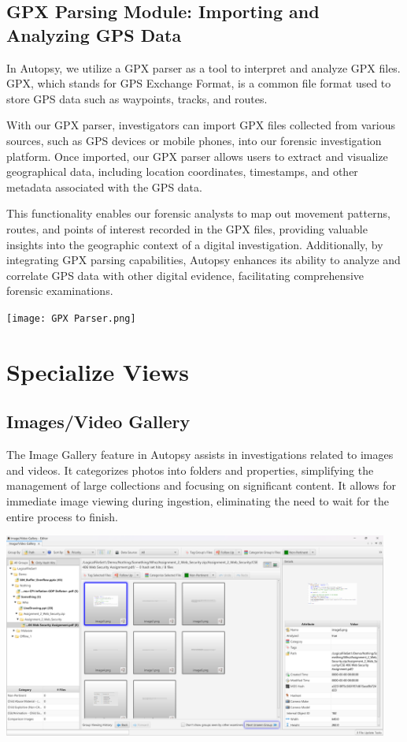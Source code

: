 \documentclass{article}
\begin{document}
\subsection{GPX Parsing Module: Importing and Analyzing GPS Data}

In Autopsy, we utilize a GPX parser as a tool to interpret and analyze GPX files. GPX, which stands for GPS Exchange Format, is a common file format used to store GPS data such as waypoints, tracks, and routes.

With our GPX parser, investigators can import GPX files collected from various sources, such as GPS devices or mobile phones, into our forensic investigation platform. Once imported, our GPX parser allows users to extract and visualize geographical data, including location coordinates, timestamps, and other metadata associated with the GPS data.

This functionality enables our forensic analysts to map out movement patterns, routes, and points of interest recorded in the GPX files, providing valuable insights into the geographic context of a digital investigation. Additionally, by integrating GPX parsing capabilities, Autopsy enhances its ability to analyze and correlate GPS data with other digital evidence, facilitating comprehensive forensic examinations.

\begin{center}
    \texttt{[image: GPX Parser.png]}
\end{center}

\section{Specialize Views}
\subsection{Images/Video Gallery}
The Image Gallery feature in Autopsy assists in investigations related to images and videos. It categorizes photos into folders and properties, simplifying the management of large collections and focusing on significant content. It allows for immediate image viewing during ingestion, eliminating the need to wait for the entire process to finish.

\begin{center}
    \includegraphics[width=0.95\textwidth]{4/4.1/Image Gallery.png}
\end{center}
\end{document}

